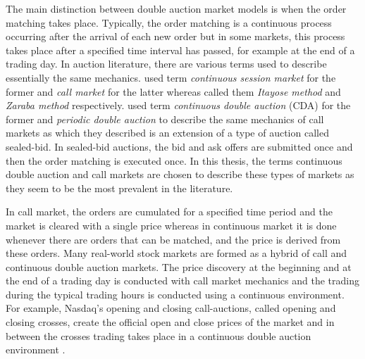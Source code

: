 The main distinction between double auction market models is when
the order matching takes place. Typically, the order matching 
is a continuous process occurring after the arrival of each new order but
in some markets, this process takes place after a specified time interval
has passed, for example at the end of a trading day. \citep{boer05}
In auction literature, there are various terms used to describe essentially 
the same mechanics. \citet{boer05} used term 
\textit{continuous session market} for the former and \textit{call market}
for the latter whereas \citet{ASt05} called them \textit{Itayose method}
and \textit{Zaraba method} respectively. \citet{Moc15} used term \textit{continuous 
double auction} (CDA) for the former and \textit{periodic double auction} to describe 
the same mechanics of call markets as which they described is an extension of 
a type of auction called sealed-bid. In sealed-bid auctions, the bid and ask offers
are submitted once and then the order matching is executed once. In this thesis,
the terms continuous double auction and call markets are chosen to describe
these types of markets as they seem to be the most prevalent in the literature.

In call market, the orders are cumulated for a specified time period and the
market is cleared with a single price whereas in continuous market it is done
whenever there are orders that can be matched, and the price is derived from these
orders. \citep{boer05} 
Many real-world stock markets are formed as a hybrid of call and continuous
double auction markets. The price discovery at the beginning and at the end of a 
trading day is conducted with call market mechanics and the trading during the 
typical trading hours is conducted using a continuous environment. \citep{NasdaqClosing05}
For example, Nasdaq's opening and closing call-auctions, called opening and closing crosses,
create the official open and close prices of the market and in between the crosses 
trading takes place in a continuous double auction environment \citep{NasdaqCrosses}.  
 
